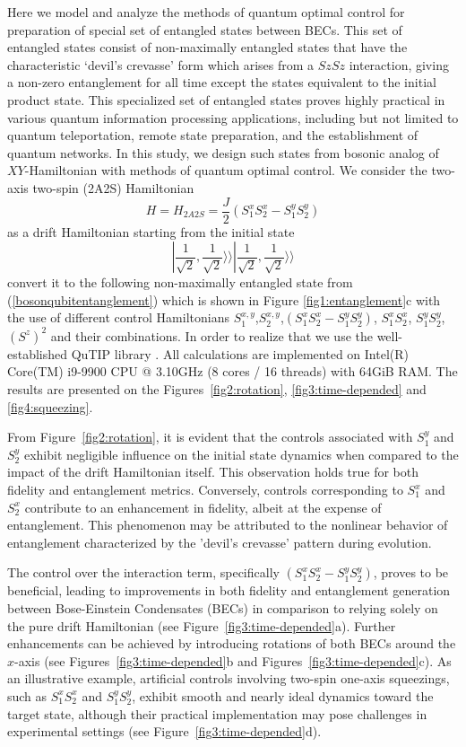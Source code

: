 \documentclass[
aps,%
12pt,%
final,%
notitlepage,%
oneside,%
onecolumn,%
nobibnotes,%
nofootinbib,%
superscriptaddress,%
noshowpacs,%
centertags]%
{revtex4}
\begin{document}
Here we model and analyze the methods of quantum optimal control for preparation of special set of entangled states between BECs. This set of entangled states consist of non-maximally entangled states that have the characteristic ‘devil’s crevasse’ form which arises from a $SzSz$ interaction, giving a non-zero entanglement for all time except the states equivalent to the initial product state. This specialized set of entangled states proves highly practical in various quantum information processing applications, including but not limited to quantum teleportation, remote state preparation, and the establishment of quantum networks. In this study, we design such states from bosonic analog of $XY$-Hamiltonian with methods of quantum optimal control. We consider the two-axis two-spin (2A2S) Hamiltonian $$H = H_{2A2S} = \frac{J}{2} (S_1^x S_2^x - S_1^y S_2^y)$$ as a drift Hamiltonian  starting from the initial state $$| \frac{1}{\sqrt{2}}, \frac{1}{\sqrt{2}} \rangle \rangle | \frac{1}{\sqrt{2}}, \frac{1}{\sqrt{2}} \rangle \rangle$$ convert it to the following non-maximally entangled state from (\ref{bosonqubitentanglement}) which is shown in Figure \ref{fig1:entanglement}c with the use of different control Hamiltonians $S_1^{x,y}$,$S_2^{x,y}$,$(S_1^x S_2^x - S_1^y S_2^y)$, $S_1^x S_2^x$, $S_1^y S_2^y$, $(S^z)^2$ and their combinations.
In order to realize that we use the well-established QuTIP library \cite{}. All calculations are implemented on Intel(R) Core(TM) i9-9900 CPU @ 3.10GHz (8 cores / 16 threads) with 64GiB RAM. The results are presented on the Figures~\ref{fig2:rotation}, \ref{fig3:time-depended} and \ref{fig4:squeezing}. 

From Figure~\ref{fig2:rotation}, it is evident that the controls associated with $S_1^y$ and $S_2^y$ exhibit negligible influence on the initial state dynamics when compared to the impact of the drift Hamiltonian itself. This observation holds true for both fidelity and entanglement metrics. Conversely, controls corresponding to $S_1^x$ and $S_2^x$ contribute to an enhancement in fidelity, albeit at the expense of entanglement. This phenomenon may be attributed to the nonlinear behavior of entanglement characterized by the 'devil’s crevasse' pattern during evolution.


The control over the interaction term, specifically $(S_1^x S_2^x - S_1^y S_2^y)$, proves to be beneficial, leading to improvements in both fidelity and entanglement generation between Bose-Einstein Condensates (BECs) in comparison to relying solely on the pure drift Hamiltonian (see Figure~\ref{fig3:time-depended}a). Further enhancements can be achieved by introducing rotations of both BECs around the $x$-axis (see Figures~\ref{fig3:time-depended}b and Figures~\ref{fig3:time-depended}c). As an illustrative example, artificial controls involving two-spin one-axis squeezings, such as $S_1^x S_2^x$ and $S_1^y S_2^y$, exhibit smooth and nearly ideal dynamics toward the target state, although their practical implementation may pose challenges in experimental settings (see Figure~\ref{fig3:time-depended}d).
\end{document}
